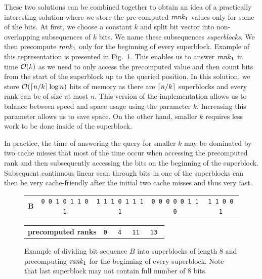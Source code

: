 These two solutions can be combined together to obtain an idea of a practically
interesting solution where we store the pre-computed $\mathit{rank}_1$ values only for some
of the bits. At first, we choose a constant $k$ and split bit vector into non-overlapping
subsequences of $k$ bits. We name these subsequences \textit{superblocks}. We then
precompute $\mathit{rank}_1$ only for the beginning of every superblock. Example of this
representation is presented in Fig.~\ref{obr:practicalRank}. This enables us to answer
$\mathit{rank}_1$ in time $\mathcal{O}(k)$ as we need to only access the precomputed value and then count
bits from the start of the superblock up to the queried position. In this solution, we store
$\mathcal{O}(\left\lceil n/k \right\rceil\log n)$ bits of memory as there are $\left\lceil n/k \right\rceil$ superblocks and every rank
can be of size at most $n$. This version of the implementation allows us to balance between
speed and space usage using the parameter $k$. Increasing this parameter allows us to save
space. On the other hand, smaller $k$ requires less work to be done inside of the superblock.

In practice, the time of answering the query for smaller $k$ may be dominated by two cache misses
that most of the time occur when accessing the precomputed rank and then subsequently accessing
the bits on the beginning of the superblock. Subsequent continuous linear scan through bits in
one of the superblocks can then be very cache-friendly after the initial two cache misses and
thus very fast.


\begin{figure}
	\begin{tabular}{c|c|c|c|c|}
	\cline{2-5}
	\textbf{B} & {\tt 0 0 1 0 1 1 0 1} & {\tt 1 1 1 0 1 1 1 1} & {\tt 0 0 0 0 0 1 1 0} & {\tt 1 1 0 0 1} \\ \cline{2-5}
	\end{tabular}

    \bigskip

    \begin{tabular}{c|c|c|c|c|}
        \cline{2-5}
        \textbf{precomputed ranks} & \tt 0 & \tt 4 & \tt 11 & \tt 13 \\ \cline{2-5}
        \end{tabular}

	\caption[TODO]{Example of dividing bit sequence $B$ into superblocks of length 8 and precomputing
    $\mathit{rank}_1$ for the beginning of every superblock. Note that last superblock may not contain full
    number of 8 bits.}
	\label{obr:practicalRank}
\end{figure}

